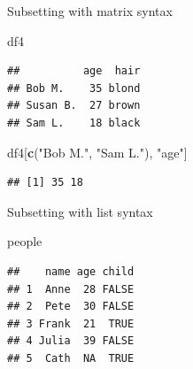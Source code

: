 \documentclass[ignorenonframetext,]{beamer}
\newenvironment{Shaded}{\begin{snugshade}}{\end{snugshade}}
\newcommand{\KeywordTok}[1]{\textcolor[rgb]{0.13,0.29,0.53}{\textbf{#1}}}
\newcommand{\NormalTok}[1]{#1}
\newcommand{\StringTok}[1]{\textcolor[rgb]{0.31,0.60,0.02}{#1}}
\begin{document}
\begin{frame}[fragile]{Subsetting with matrix syntax}
\protect\hypertarget{subsetting-with-matrix-syntax-13}{}

\begin{Shaded}
\begin{Highlighting}[]
\NormalTok{df4}
\end{Highlighting}
\end{Shaded}

\begin{verbatim}
##          age  hair
## Bob M.    35 blond
## Susan B.  27 brown
## Sam L.    18 black
\end{verbatim}

\begin{Shaded}
\begin{Highlighting}[]
\NormalTok{df4[}\KeywordTok{c}\NormalTok{(}\StringTok{"Bob M."}\NormalTok{, }\StringTok{"Sam L."}\NormalTok{), }\StringTok{"age"}\NormalTok{]}
\end{Highlighting}
\end{Shaded}

\begin{verbatim}
## [1] 35 18
\end{verbatim}

\end{frame}

\begin{frame}[fragile]{Subsetting with list syntax}
\protect\hypertarget{subsetting-with-list-syntax}{}

\begin{Shaded}
\begin{Highlighting}[]
\NormalTok{people}
\end{Highlighting}
\end{Shaded}

\begin{verbatim}
##    name age child
## 1  Anne  28 FALSE
## 2  Pete  30 FALSE
## 3 Frank  21  TRUE
## 4 Julia  39 FALSE
## 5  Cath  NA  TRUE
\end{verbatim}

\end{frame}
\end{document}
